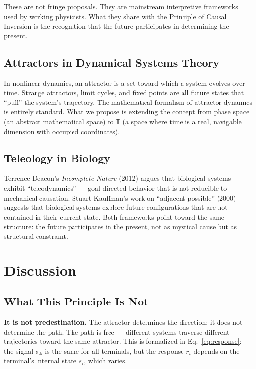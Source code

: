 \documentclass[12pt,a4paper]{article}
\newcommand{\tspc}{\mathbb{T}}
\begin{document}
These are not fringe proposals. They are mainstream interpretive frameworks used by working physicists. What they share with the Principle of Causal Inversion is the recognition that the future participates in determining the present.

\subsection{Attractors in Dynamical Systems Theory}

In nonlinear dynamics, an attractor is a set toward which a system evolves over time. Strange attractors, limit cycles, and fixed points are all future states that ``pull'' the system's trajectory. The mathematical formalism of attractor dynamics is entirely standard. What we propose is extending the concept from phase space (an abstract mathematical space) to $\tspc$ (a space where time is a real, navigable dimension with occupied coordinates).

\subsection{Teleology in Biology}

Terrence Deacon's \emph{Incomplete Nature} (2012) argues that biological systems exhibit ``teleodynamics'' --- goal-directed behavior that is not reducible to mechanical causation. Stuart Kauffman's work on ``adjacent possible'' (2000) suggests that biological systems explore future configurations that are not contained in their current state. Both frameworks point toward the same structure: the future participates in the present, not as mystical cause but as structural constraint.


\section{Discussion}

\subsection{What This Principle Is Not}

\textbf{It is not predestination.} The attractor determines the direction; it does not determine the path. The path is free --- different systems traverse different trajectories toward the same attractor. This is formalized in Eq.~\eqref{eq:response}: the signal $\sigma_{\mathbb{A}}$ is the same for all terminals, but the response $r_i$ depends on the terminal's internal state $s_i$, which varies.
\end{document}
